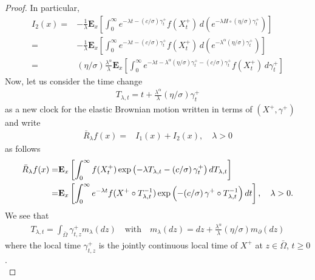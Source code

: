 \documentclass[11pt,a4paper]{article}
\begin{document}
\begin{proof}
In particular,
\begin{align*}
I_2(x)
= & - \frac{1}{\lambda} \mathbf{E}_x\left[ \int_0^\infty e^{- \lambda t - (c/\sigma) \gamma^+_t } f(X^+_t) \, d( e^{-\lambda H \circ (\eta/\sigma) \gamma^+_t }) \right]\\
= & - \frac{1}{\lambda} \mathbf{E}_x\left[ \int_0^\infty e^{- \lambda t - (c/\sigma) \gamma^+_t } f(X^+_t) \, d( e^{-\lambda^\alpha (\eta/\sigma) \gamma^+_t }) \right]\\
= & (\eta/\sigma) \frac{\lambda^\alpha}{\lambda} \mathbf{E}_x\left[ \int_0^\infty e^{- \lambda t -\lambda^\alpha (\eta/\sigma) \gamma^+_t - (c/\sigma) \gamma^+_t } f(X^+_t) \, d\gamma^+_t \right]
\end{align*}
Now, let us consider the time change
\begin{align}
T_{\lambda, t} = t + \frac{\lambda^\alpha}{\lambda }(\eta /\sigma) \gamma^+_t
\label{TimeChangeLambda}
\end{align}
as a new clock for the elastic Brownian motion written in terms of $(X^+, \gamma^+)$ and write
\begin{align}
\label{RbarIunodue}
\bar{R}_\lambda f(x) = & I_1(x) + I_2(x), \quad \lambda>0
\end{align}
as follows
\begin{align}
\bar{R}_\lambda f(x) = & \mathbf{E}_x \left[ \int_0^\infty f(X^+_t) \exp \left(- \lambda T_{\lambda, t}  - (c / \sigma)\, \gamma^+_t \right) dT_{\lambda, t} \right] \label{potTimeChangeTlambda}\\
= & \mathbf{E}_x \left[ \int_0^\infty e^{-\lambda t} f(X^+ \circ T^{-1}_{\lambda, t}) \exp \left(-(c/\sigma)\, \gamma^+ \circ T^{-1}_{\lambda, t} \right) dt \right], \quad \lambda>0. \notag
\end{align}
We see that 
\begin{align}
T_{\lambda, t} = \int_{\bar{\Omega}} \gamma^+_{t,z} m_\lambda(dz) \quad \textrm{with} \quad m_\lambda(dz) = dz + \frac{\lambda^\alpha}{\lambda} (\eta/\sigma) m_\partial(dz)
\label{Tlambda}
\end{align}
where the local time $\gamma^+_{t,z}$ is the jointly continuous local time of $X^+$ at $z \in \bar{\Omega}$, $t\geq 0$.\\


\end{proof}
\end{document}
